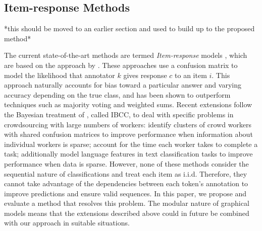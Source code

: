 % 
% 
% 

\subsection{Item-response Methods}

*this should be moved to an earlier section and used to build up to the proposed method*

The current state-of-the-art methods are termed \emph{Item-response} models \cite{Felt2016SemanticAA},
which are based on the approach by \cite{dawid_maximum_1979}. These approaches use a confusion matrix
to model the likelihood that annotator $k$ gives response $c$ to an item $i$. 
This approach naturally accounts for bias toward a particular answer and varying accuracy 
depending on the true class, and has been 
shown to outperform techniques such as majority voting and weighted sums\cite{simpsonlong,raykar12,kim2003}.
Recent extensions follow the Bayesian treatment of \cite{kim2003}, called IBCC,
to deal with specific problems in crowdsourcing with large numbers of workers:
\cite{moreno_bayesian_2015,venanzi2014community} identify clusters of crowd workers
with shared confusion matrices to improve performance when information about individual workers is sparse;
\cite{venanzi2016time} account for the time each worker takes to complete a task;
\cite{Felt2016SemanticAA, simpson2015language} additionally model language features in text classification tasks
to improve performance when data is sparse.
However, none of these methods consider the sequential nature of classifications and treat each item as i.i.d.
Therefore, they cannot take advantage of the dependencies between each token's annotation to improve
predictions and ensure valid sequences. 
In this paper, we propose and evaluate a method that resolves this problem. 
The modular nature of graphical models means that the extensions described above could in future be combined
with our approach in suitable situations.

